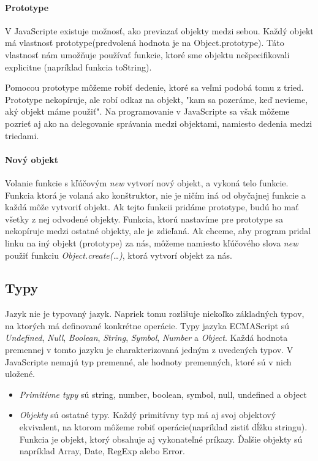 \paragraph{Prototype}
V JavaScripte existuje možnosť, ako previazať objekty medzi sebou. Každý objekt má vlastnosť prototype(predvolená hodnota je na Object.prototype). Táto vlastnosť nám umožňuje používať funkcie, ktoré sme objektu nešpecifikovali explicitne (napríklad funkcia toString).

Pomocou prototype môžeme robiť dedenie, ktoré sa veľmi podobá tomu z tried. Prototype nekopíruje, ale robí odkaz na objekt, "kam sa pozeráme, keď nevieme, aký objekt máme použiť".
Na programovanie v JavaScripte sa však môžeme pozrieť aj ako na delegovanie správania medzi objektami, namiesto dedenia medzi triedami.

\paragraph{Nový objekt}
Volanie funkcie s kľúčovým \emph{new} vytvorí nový objekt, a vykoná telo funkcie. Funkcia ktorá je volaná ako konštruktor, nie je ničím iná od obyčajnej funkcie a každá môže vytvoriť objekt.
Ak tejto funkcii pridáme prototype, budú ho mať všetky z nej odvodené objekty. Funkcia, ktorú nastavíme pre prototype sa nekopíruje medzi ostatné objekty, ale je zdieľaná.
Ak chceme, aby program pridal linku na iný objekt (prototype) za nás, môžeme namiesto kľúčového slova \emph{new} použiť funkciu \emph{Object.create(\ldots)}, ktorá vytvorí objekt za nás.


\subsection{Typy}
Jazyk \JS{} nie je typovaný jazyk. Napriek tomu rozlišuje niekoľko základných typov, na ktorých má definované konkrétne operácie. Typy jazyka ECMAScript sú \emph{Undefined}, \emph{Null}, \emph{Boolean}, \emph{String}, \emph{Symbol}, \emph{Number} a \emph{Object}. Každá hodnota premennej v tomto jazyku je charakterizovaná jedným z uvedených typov. V JavaScripte nemajú typ premenné, ale hodnoty premenných, ktoré sú v nich uložené.

\begin{itemize}
  \item \emph{Primitívne typy} sú string, number, boolean, symbol, null, undefined a object
  \item \emph{Objekty} sú ostatné typy. Každý primitívny typ má aj svoj objektový ekvivalent, na ktorom môžeme robiť operácie(napríklad zistiť dĺžku stringu). Funkcia je objekt, ktorý obsahuje aj vykonateľné príkazy. Ďalšie objekty sú napríklad Array, Date, RegExp alebo Error.
\end{itemize}

